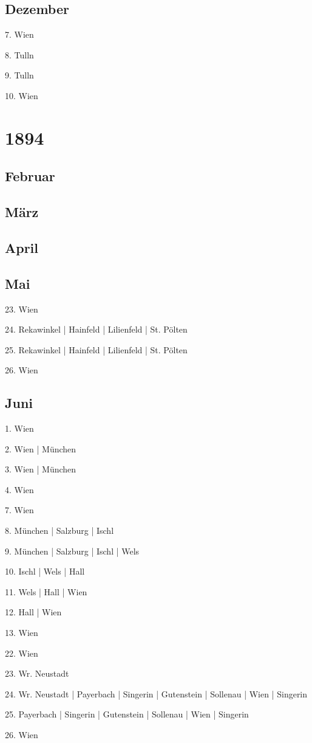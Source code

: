 \documentclass[twoside=false,titlepage=false,open=any, parskip=never, fontsize=10pt, headings=small, chapterprefix=false, appendixprefix=false, DIV=15]{scrbook}
\begin{document}
\begin{multicols}{3}
            \section*{Dezember}
            7. Wien\par
            8. Tulln\par
            9. Tulln\par
            10. Wien\par
            \chapter*{1894}
            \section*{Februar}
            \section*{März}
            \section*{April}
            \section*{Mai}
            23. Wien\par
            24. Rekawinkel | Hainfeld | Lilienfeld | St. Pölten\par
            25. Rekawinkel | Hainfeld | Lilienfeld | St. Pölten\par
            26. Wien\par
            \section*{Juni}
            1. Wien\par
            2. Wien | München\par
            3. Wien | München\par
            4. Wien\par
            7. Wien\par
            8. München | Salzburg | Ischl\par
            9. München | Salzburg | Ischl | Wels\par
            10. Ischl | Wels | Hall\par
            11. Wels | Hall | Wien\par
            12. Hall | Wien\par
            13. Wien\par
            22. Wien\par
            23. Wr. Neustadt\par
            24. Wr. Neustadt | Payerbach | Singerin | Gutenstein | Sollenau | Wien | Singerin\par
            25. Payerbach | Singerin | Gutenstein | Sollenau | Wien | Singerin\par
            26. Wien\par

\end{multicols}
\end{document}

